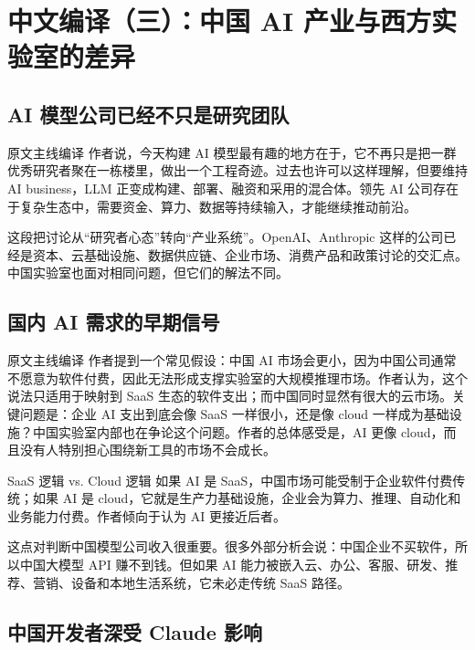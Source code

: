 \section{中文编译（三）：中国 AI 产业与西方实验室的差异}

\subsection{AI 模型公司已经不只是研究团队}

\begin{translationbox}{原文主线编译}
作者说，今天构建 AI 模型最有趣的地方在于，它不再只是把一群优秀研究者聚在一栋楼里，做出一个工程奇迹。过去也许可以这样理解，但要维持 AI business，LLM 正变成构建、部署、融资和采用的混合体。领先 AI 公司存在于复杂生态中，需要资金、算力、数据等持续输入，才能继续推动前沿。
\end{translationbox}

这段把讨论从``研究者心态''转向``产业系统''。OpenAI、Anthropic 这样的公司已经是资本、云基础设施、数据供应链、企业市场、消费产品和政策讨论的交汇点。中国实验室也面对相同问题，但它们的解法不同。

\subsection{国内 AI 需求的早期信号}

\begin{translationbox}{原文主线编译}
作者提到一个常见假设：中国 AI 市场会更小，因为中国公司通常不愿意为软件付费，因此无法形成支撑实验室的大规模推理市场。作者认为，这个说法只适用于映射到 SaaS 生态的软件支出；而中国同时显然有很大的云市场。关键问题是：企业 AI 支出到底会像 SaaS 一样很小，还是像 cloud 一样成为基础设施？中国实验室内部也在争论这个问题。作者的总体感受是，AI 更像 cloud，而且没有人特别担心围绕新工具的市场不会成长。
\end{translationbox}

\begin{importantbox}{SaaS 逻辑 vs. Cloud 逻辑}
如果 AI 是 SaaS，中国市场可能受制于企业软件付费传统；如果 AI 是 cloud，它就是生产力基础设施，企业会为算力、推理、自动化和业务能力付费。作者倾向于认为 AI 更接近后者。
\end{importantbox}

这点对判断中国模型公司收入很重要。很多外部分析会说：中国企业不买软件，所以中国大模型 API 赚不到钱。但如果 AI 能力被嵌入云、办公、客服、研发、推荐、营销、设备和本地生活系统，它未必走传统 SaaS 路径。

\subsection{中国开发者深受 Claude 影响}

